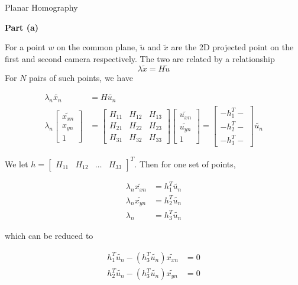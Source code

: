 \documentclass{scrbook}
\begin{document}
Planar Homography

\textbf{Part (a)}

For a point $w$ on the common plane, $\tilde{u}$ and $\tilde{x}$ are the 2D projected point on the first and second camera respectively. The two are related by a relationship
\begin{equation*}
\lambda \tilde{x}=H\tilde{u}
\end{equation*}
For $N$ pairs of such points, we have

\begin{align*}
\lambda _{n}\widetilde{x_{n}}&=H\widetilde{u_{n}} \\
\lambda _{n}\left[\begin{array}{c}
\widetilde{x_{xn}}\\
x_{yn}\\
1
\end{array}\right]&=\begin{bmatrix}
H_{11} & H_{12} & H_{13}\\
H_{21} & H_{22} & H_{23}\\
H_{31} & H_{32} & H_{33}
\end{bmatrix}\left[\begin{array}{c}
\widetilde{u_{xn}}\\
\widetilde{u_{yn}}\\
1
\end{array}\right]=\left[\begin{array}{c}
-{h}_{1}^{T}-\\
-{h}_{2}^{T}-\\
-{h}_{3}^{T}-
\end{array}\right]\widetilde{u_{n}} 
\end{align*}

We let $h=\left[\begin{array}{cccc}
H_{11} & H_{12} & \ldots & H_{33}
\end{array}\right]^{T}$. Then for one set of points,

\begin{align*}
\lambda _{n}\widetilde{x_{xn}}&={h}_{1}^{T}\widetilde{u_{n}} \\
\lambda _{n}\widetilde{x_{yn}}&={h}_{2}^{T}\widetilde{u_{n}} \\
\lambda _{n}&={h}_{3}^{T}\widetilde{u_{n}} 
\end{align*}

which can be reduced to

\begin{align*}
{h}_{1}^{T}\widetilde{u_{n}}-\left({h}_{3}^{T}\widetilde{u_{n}}\right)\widetilde{x_{xn}}&=0 \\
{h}_{2}^{T}\widetilde{u_{n}}-\left({h}_{3}^{T}\widetilde{u_{n}}\right)\widetilde{x_{yn}}&=0 
\end{align*}
\end{document}
